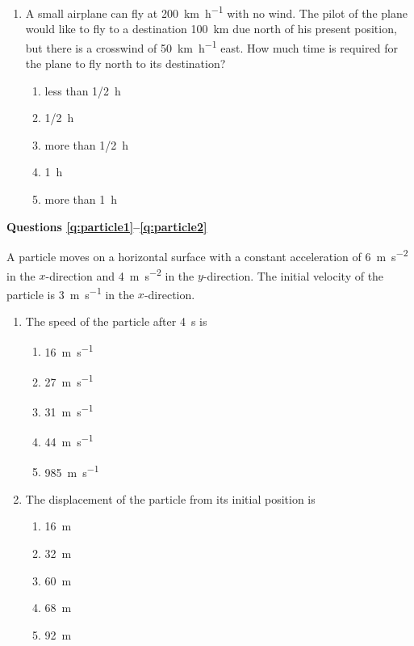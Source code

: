 \documentclass{../../../oss-apphys}
\begin{document}
\begin{multicols}{2}
\begin{enumerate}[resume,leftmargin=18pt]
  \item A small airplane can fly at \SI{200}{\kilo\metre\per\hour} with no
    wind. The pilot of the plane would like to fly to a destination
    \SI{100}{\kilo\metre} due north of his present position, but there is a
    crosswind of \SI{50}{\kilo\metre\per\hour} east. How much time is required
    for the plane to fly north to its destination?
    \begin{enumerate}[nosep,leftmargin=18pt,label=(\Alph*)]
    \item less than \SI{1/2}{\hour}
    \item \SI{1/2}{\hour}
    \item more than \SI{1/2}{\hour}
    \item \SI{1}{\hour}
    \item more than \SI{1}{\hour}
    \end{enumerate}
    
  \end{enumerate}
  \columnbreak
  
  \textbf{Questions \ref{q:particle1}--\ref{q:particle2}}

  A particle moves on a horizontal surface with a constant acceleration of
  \SI{6}{\metre\per\second\squared} in the $x$-direction and
  \SI{4}{\metre\per\second\squared} in the $y$-direction. The initial velocity
  of the particle is \SI{3}{\metre\per\second} in the $x$-direction.
  \begin{enumerate}[resume,leftmargin=18pt]
  \item The speed of the particle after \SI{4}{\second} is
    \begin{enumerate}[nosep,leftmargin=18pt,label=(\Alph*)]
    \item\SI{16}{\metre\per\second}
    \item\SI{27}{\metre\per\second}
    \item\SI{31}{\metre\per\second}
    \item\SI{44}{\metre\per\second}
    \item\SI{985}{\metre\per\second}
    \end{enumerate}
    \label{q:particle1}
    
  \item The displacement of the particle from its initial position is
    \begin{enumerate}[nosep,leftmargin=18pt,label=(\Alph*)]
    \item\SI{16}{\metre}
    \item\SI{32}{\metre}
    \item\SI{60}{\metre}
    \item\SI{68}{\metre}
    \item\SI{92}{\metre}
    \end{enumerate}
    \label{q:particle2}
    

\end{enumerate}
\end{multicols}
\end{document}
